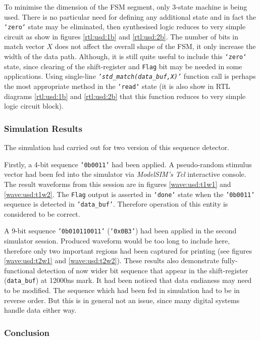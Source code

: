 \documentclass[10pt,a4paper]{report}
\begin{document}
 To minimise the dimension of the FSM segment,
 only 3-state machine is being used. There is
 no particular need for defining any additional
 state and in fact the \texttt{`zero`} state
 may be eliminated, then synthesised logic
 reduces to very simple circuit as show in
 figures \ref{rtl:usd:1b} and \ref{rtl:usd:2b}.
 The number of bits in match vector $X$ does
 not affect the overall shape of the FSM, it
 only increase the width of the data path.
 Although, it is still quite useful to include
 this \texttt{`zero`} state, since clearing
 of the shift-register and \texttt{Flag} bit
 may be needed in some applications. Using
 single-line \emph{\texttt{'std\_match(data\_buf,X)'}}
 function call is perhaps the most appropriate
 method in the \texttt{`read`} state (it is
 also show in RTL diagrams \ref{rtl:usd:1b}
 and \ref{rtl:usd:2b} that this function
 reduces to very simple logic circuit block).

\subsubsection*{Simulation Results}

 The simulation had carried out for two
 version of this sequence detector.
 
 Firstly, a 4-bit sequence \texttt{'0b0011'}
 had been applied. A pseudo-random stimulus
 vector had been fed into the simulator
 via \emph{ModelSIM's Tcl} interactive console.
 The result waveforms from this session
 are in figures \ref{wave:usd:t1w1} and
 \ref{wave:usd:t1w2}. The \texttt{Flag}
 output is asserted in \texttt{`done`}
 state when the \texttt{'0b0011'} sequence
 is detected in \texttt{'data\_buf'}.
 Therefore operation of this entity is
 considered to be correct.

 A 9-bit sequence \texttt{'0b010110011'}
 (\texttt{'0x0B3'}) had been applied
 in the second simulator session.
 Produced waveform would be too long
 to include here, therefore only
 two important regions had been
 captured for printing (see figures
 \ref{wave:usd:t2w1} and \ref{wave:usd:t2w2}).
 These results also demonstrate
 fully-functional detection of now wider bit
 sequence that appear in the shift-register
 (\texttt{data\_buf}) at 12000ns mark.
 It had been noticed that data endianess
 may need to be modified. The sequence
 which had been fed in simulation had
 to be in reverse order. But this is
 in general not an issue, since many
 digital systems handle data either way.


\subsubsection*{Conclusion}
\end{document}
